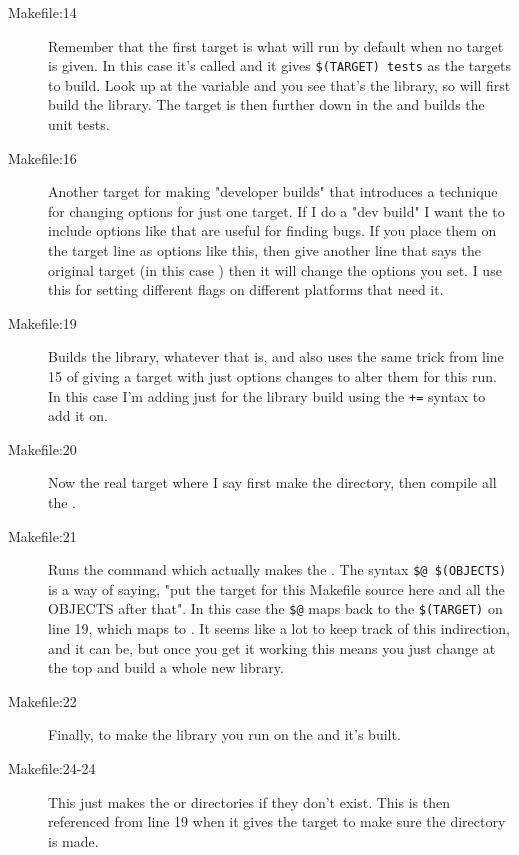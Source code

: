 \begin{description}
\item[Makefile:14] Remember that the first target is what  will
    run by default when no target is given.  In this case it's called 
    and it gives \verb|$(TARGET) tests| as the targets to build.  Look up at
    the  variable and you see that's the library, so 
    will first build the library.  The  target is then further
    down in the  and builds the unit tests.
\item[Makefile:16] Another target for making "developer builds" that introduces
    a technique for changing options for just one target.  If I do a "dev build"
    I want the  to include options like  that are
    useful for finding bugs.  If you place them on the target line as options
    like this, then give another line that says the original target (in this
    case ) then it will change the options you set.  I use this for
    setting different flags on different platforms that need it.
\item[Makefile:19] Builds the  library, whatever that is, and also
    uses the same trick from line 15 of giving a target with just options changes
    to alter them for this run.  In this case I'm adding  just for
    the library build using the \verb|+=| syntax to add it on.
\item[Makefile:20] Now the real target where I say first make the 
    directory, then compile all the .
\item[Makefile:21] Runs the  command which actually makes the
    .  The syntax \verb|$@ $(OBJECTS)| is a way of saying,
    "put the target for this Makefile source here and all the OBJECTS after that".
    In this case the \verb|$@| maps back to the \verb|$(TARGET)| on line 19,
    which maps to .  It seems like a lot to 
    keep track of this indirection, and it can be, but once you get it working
    this means you just change  at the top and build a whole
    new library.
\item[Makefile:22] Finally, to make the library you run  on the
     and it's built.
\item[Makefile:24-24] This just makes the  or  directories
    if they don't exist.  This is then referenced from line 19 when it gives the
     target to make sure the  directory is made.
\end{description}

